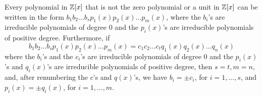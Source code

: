 
\begin{theorem}
	Every polynomial in $\mathbb{Z}[x]$ that is not the zero polynomial or a unit in $\mathbb{Z}[x]$ can be written in the form $b_1b_2\dots b_sp_1(x)p_2(x)\dots p_m(x)$, where the $b_i$'s are irreducible polynomials of degree 0 and the $p_i(x)$'s are irreducible polynomials of positive degree. Furthermore, if
	\[ b_1b_2\dots b_sp_1(x)p_2(x) \dots p_m(x) = c_1c_2 \dots c_tq_1(x) q_2(x) \dots q_n(x) \]
	\noindent where the $b_i$'s and the $c_i$'s are irreducible polynomials of degree 0 and the $p_i(x)$'s and $q_i(x)$'s are irreducible polynomials of positive degree, then $s=t, m=n$, and, after renumbering the $c$'s and $q(x)$'s, we have $b_i = \pm c_i$, for $i=1, \dots, s$, and $p_i(x)= \pm q_i(x)$, for $i = 1, \dots, m$.
\end{theorem}
